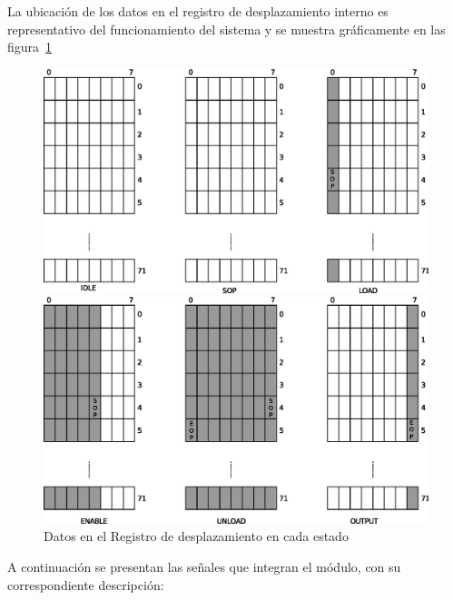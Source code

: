 La ubicación de los datos en el registro de desplazamiento interno es representativo del funcionamiento del sistema y se muestra gráficamente en las figura~\ref{fig:regdata}
\begin{figure}[H]
  \centering

	\includegraphics[scale=0.70]{3-arquitectura/graf/regdespl01.eps}


   \hspace{1\linewidth}
	\includegraphics[scale=0.70]{3-arquitectura/graf/regdespl02.eps}



  \caption{Datos en el Registro de desplazamiento en cada estado }
  \label{fig:regdata}
\end{figure}




A continuación se presentan las señales que integran el módulo, con su correspondiente descripción:

